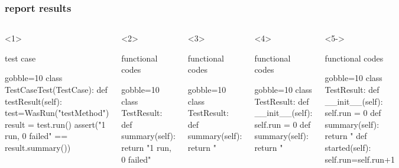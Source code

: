 \documentclass[lualatex]{beamer}
\begin{document}
\begin{frame}[fragile,t]
  \frametitle{report results}

  \begin{columns}[t]
    \small
    \begin{onlyenv}<1>
      \begin{block}{test case}
        \begin{pythoncode*}{gobble=10}
          class TestCaseTest(TestCase):
            def testResult(self):
              test=WasRun("testMethod")
              result = test.run()
              assert("1 run, 0 failed"
                == result.summary())
        \end{pythoncode*}
      \end{block}
    \end{onlyenv}
    \begin{onlyenv}<2>
      \begin{block}{functional codes}
        \begin{pythoncode*}{gobble=10}
          class TestResult:
            def summary(self):
              return "1 run, 0 failed"
        \end{pythoncode*}
      \end{block}
    \end{onlyenv}
    \begin{onlyenv}<3>
      \begin{block}{functional codes}
        \begin{pythoncode*}{gobble=10}
          class TestResult:
            def summary(self):
              return "%
        \end{pythoncode*}
      \end{block}
    \end{onlyenv}
    \begin{onlyenv}<4>
      \begin{block}{functional codes}
        \begin{pythoncode*}{gobble=10}
          class TestResult:
            def __init__(self):
              self.run = 0
            def summary(self):
              return "%
        \end{pythoncode*}
      \end{block}
    \end{onlyenv}
    \begin{onlyenv}<5->
      \begin{block}{functional codes}
        \begin{pythoncode*}{gobble=10}
          class TestResult:
            def __init__(self):
              self.run = 0
            def summary(self):
              return "%
            def started(self):
              self.run=self.run+1
        \end{pythoncode*}
      \end{block}
    \end{onlyenv}


\end{columns}
\end{frame}
\end{document}
